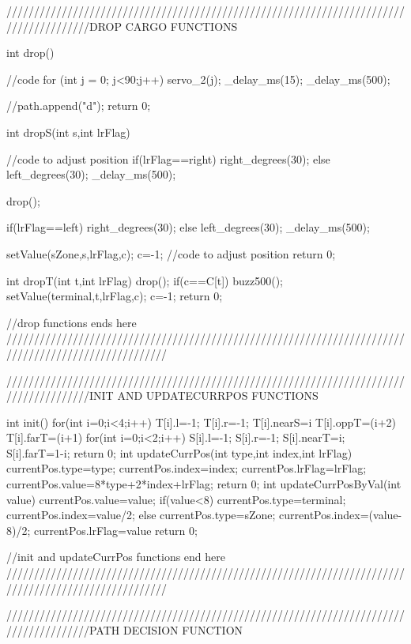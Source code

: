 ///////////////////////////////////////////////////////////////////////////////////////DROP CARGO FUNCTIONS

int drop()
{
    //code
	for (int j = 0; j<90;j++)
	{ servo_2(j);
		_delay_ms(15);
	}
	_delay_ms(500);
	
    //path.append("d");
    return 0;
}
int dropS(int s,int lrFlag)
{
    //code to adjust position
    if(lrFlag==right)
    right_degrees(30);
    else
    left_degrees(30);
    _delay_ms(500);
	
	drop();
	
	if(lrFlag==left)
	right_degrees(30);
	else
	left_degrees(30);
	_delay_ms(500);

    setValue(sZone,s,lrFlag,c);
    c=-1;
    //code to adjust position
	return 0;
}
int dropT(int t,int lrFlag)
{
    drop();
	if(c==C[t])
		buzz500();
    setValue(terminal,t,lrFlag,c);
    c=-1;
	return 0;
}

//drop functions ends here
/////////////////////////////////////////////////////////////////////////////////////////////////////


///////////////////////////////////////////////////////////////////////////////////////INIT AND UPDATECURRPOS FUNCTIONS

int init()
{
    for(int i=0;i<4;i++)
    {
        T[i].l=-1;
        T[i].r=-1;
        T[i].nearS=i%
        T[i].oppT=(i+2)%
        T[i].farT=(i+1)%
    }
    for(int i=0;i<2;i++)
    {
        S[i].l=-1;
        S[i].r=-1;
        S[i].nearT=i;
        S[i].farT=1-i;
    }
    return 0;
}
int updateCurrPos(int type,int index,int lrFlag)
{
    currentPos.type=type;
    currentPos.index=index;
    currentPos.lrFlag=lrFlag;
    currentPos.value=8*type+2*index+lrFlag;
    return 0;
}
int updateCurrPosByVal(int value)
{
    currentPos.value=value;
    if(value<8)
    {
        currentPos.type=terminal;
        currentPos.index=value/2;
    }
    else
    {
        currentPos.type=sZone;
        currentPos.index=(value-8)/2;
    }
    currentPos.lrFlag=value%
    return 0;
}

//init and updateCurrPos functions end here
/////////////////////////////////////////////////////////////////////////////////////////////////////


///////////////////////////////////////////////////////////////////////////////////////PATH DECISION FUNCTION

